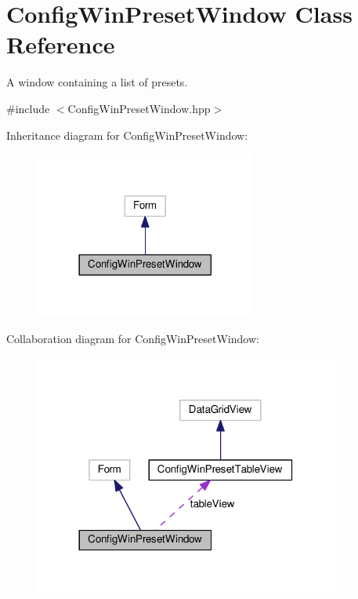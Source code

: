 \hypertarget{classConfigWinPresetWindow}{}\section{Config\+Win\+Preset\+Window Class Reference}
\label{classConfigWinPresetWindow}


A window containing a list of presets.  




{\ttfamily \#include $<$Config\+Win\+Preset\+Window.\+hpp$>$}



Inheritance diagram for Config\+Win\+Preset\+Window\+:
\nopagebreak
\begin{figure}[H]
\begin{center}
\leavevmode
\includegraphics[width=206pt]{classConfigWinPresetWindow__inherit__graph}
\end{center}
\end{figure}


Collaboration diagram for Config\+Win\+Preset\+Window\+:
\nopagebreak
\begin{figure}[H]
\begin{center}
\leavevmode
\includegraphics[width=284pt]{classConfigWinPresetWindow__coll__graph}
\end{center}
\end{figure}
